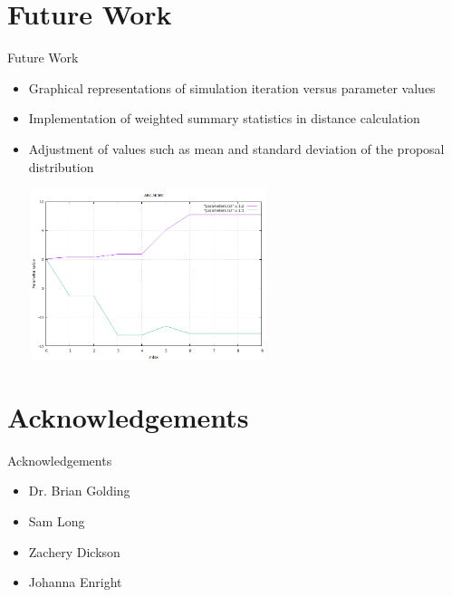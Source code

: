 \documentclass{beamer}
\begin{document}
	
	\section{Future Work}
	\begin{frame}{Future Work}
		
		\begin{itemize}
			\item Graphical representations of simulation iteration versus parameter values 
			\item Implementation of weighted summary statistics in distance calculation
			\item Adjustment of values such as mean and standard deviation of the proposal distribution
			
			\centering\includegraphics[width=7cm, height=5cm]{graph.png}
			
		\end{itemize}
		
	\end{frame}

	\section{Acknowledgements}
	\begin{frame}{Acknowledgements}
		\begin{itemize}
			\item Dr. Brian Golding \newline
			\item Sam Long \newline
			\item Zachery Dickson \newline
			\item Johanna Enright
		\end{itemize}
	\end{frame}
		
\end{document}

